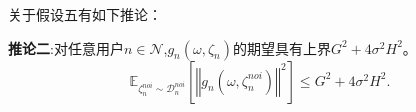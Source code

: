 
关于假设五有如下推论：

\noindent \textbf{推论二}:对任意用户$n\in \mathcal{N}$,$g_n(\omega,\zeta_n)$的期望具有上界$G^2+4\sigma^2H^2$。
\begin{equation}\label{j7}
\mathbb{E}_{\zeta_n^{noi}\sim \mathcal{D}_n^{noi}}\left[\left\Vert g_n\left(\omega, \zeta_n^{noi}\right) \right\Vert^2\right] \leq G^2+4\sigma^2H^2. 
\end{equation}

